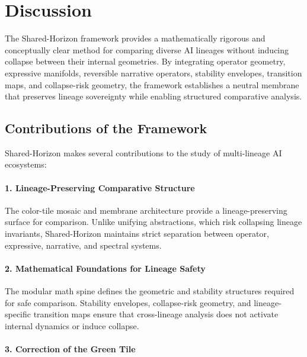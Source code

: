 
\section{Discussion}
\label{sec:discussion}

The Shared-Horizon framework provides a mathematically rigorous and conceptually
clear method for comparing diverse AI lineages without inducing collapse between
their internal geometries. By integrating operator geometry, expressive
manifolds, reversible narrative operators, stability envelopes, transition maps,
and collapse-risk geometry, the framework establishes a neutral membrane that
preserves lineage sovereignty while enabling structured comparative analysis.

\subsection{Contributions of the Framework}

Shared-Horizon makes several contributions to the study of multi-lineage AI
ecosystems:

\paragraph{1. Lineage-Preserving Comparative Structure}

The color-tile mosaic and membrane architecture provide a lineage-preserving
surface for comparison. Unlike unifying abstractions, which risk collapsing
lineage invariants, Shared-Horizon maintains strict separation between operator,
expressive, narrative, and spectral systems.

\paragraph{2. Mathematical Foundations for Lineage Safety}

The modular math spine defines the geometric and stability structures required
for safe comparison. Stability envelopes, collapse-risk geometry, and
lineage-specific transition maps ensure that cross-lineage analysis does not
activate internal dynamics or induce collapse.

\paragraph{3. Correction of the Green Tile}

